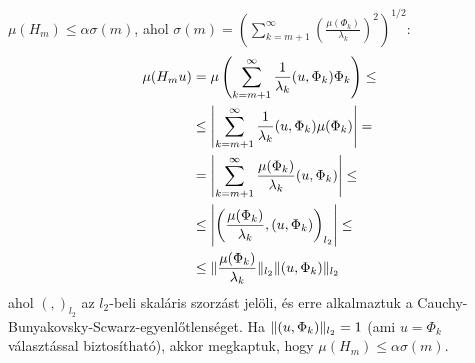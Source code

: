 \documentclass[oneside, titlepage, 12pt, a4paper]{report}
\DeclarePairedDelimiter\norm{\lVert}{\rVert}	%
\begin{document}
$\mu(H_m) \leq \alpha \sigma(m)$, ahol $\sigma(m) = \left(\sum_{k = m+1}^\infty \left( \frac{\mu(\Phi_k)}{\lambda_k}\right)^2\right)^{1/2}$:
\begin{align*}
\mu(H_m u) &= \mu \left( \sum_{k = m+1}^\infty \frac{1}{\lambda_k} (u, \Phi_k) \Phi_k \right) \leq \\
 &\leq \left| \sum_{k = m+1}^\infty \frac{1}{\lambda_k} (u, \Phi_k) \mu(\Phi_k) \right| = \\
 &= \left| \sum_{k = m+1}^\infty \frac{\mu(\Phi_k)}{\lambda_k} (u, \Phi_k) \right| \leq \\
 &\leq \left| \left( \frac{\mu(\Phi_k)}{\lambda_k}, (u, \Phi_k) \right)_{l_2} \right| \leq \\
 &\leq \norm{\frac{\mu(\Phi_k)}{\lambda_k}}_{l_2} \norm{(u, \Phi_k)}_{l_2}
\end{align*}
ahol $\left( , \right)_{l_2}$ az $l_2$-beli skaláris szorzást jelöli, és erre alkalmaztuk a Cauchy-Bunyakovsky-Scwarz-egyenlőtlenséget. Ha $\norm{(u, \Phi_k)}_{l_2} = 1$ (ami $u = \Phi_k$ választással biztosítható), akkor megkaptuk, hogy $\mu(H_m) \leq \alpha \sigma(m)$. %



 

 
\end{document}
